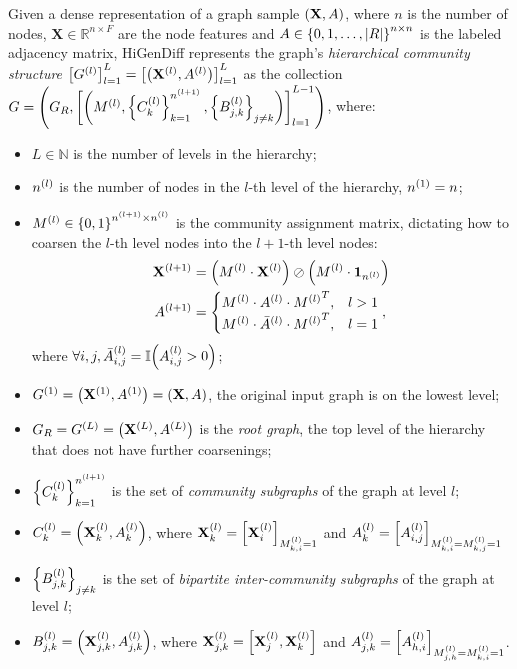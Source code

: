 Given a dense representation of a graph sample $\of{\mathbf{X},A}$, where $n$ is the number of nodes, $\mathbf{X} \in \mathbb{R}^{n \times F}$ are the node features and $A \in \offf{0,1,\dots,\abs{R}}^{n \times n}$ is the labeled adjacency matrix, HiGenDiff represents the graph's \emph{hierarchical community structure} $\off{G^{\of{l}}}_{l=1}^{L}=\off{\of{\mathbf{X}^{\of{l}},A^{\of{l}}}}_{l=1}^{L}$ as the collection $G=\of{G_R,\off{\of{M^{\of{l}}, \offf{C^{\of{l}}_{k}}_{k=1}^{n^{\of{l+1}}},\offf{B^{\of{l}}_{j,k}}_{j \neq k}}}_{l=1}^{L-1}}$, where:
\begin{itemize}
    \item $L \in \mathbb{N}$ is the number of levels in the hierarchy;
    \item $n^{\of{l}}$ is the number of nodes in the $l$-th level of the hierarchy, $n^{\of{1}}=n$;
    \item $M^{\of{l}} \in \offf{0,1}^{n^{\of{l+1}} \times n^{\of{l}}}$ is the community assignment matrix, dictating how to coarsen the $l$-th level nodes into the $l+1$-th level nodes:
    \begin{align}
        \begin{split}
            \mathbf{X}^{\of{l+1}}&=\of{M^{\of{l}} \cdot \mathbf{X}^{\of{l}}} \oslash \of{M^{\of{l}} \cdot \mathbf{1}_{n^{\of{l}}}} \\
            A^{\of{l+1}}&=\begin{cases}
                M^{\of{l}} \cdot A^{\of{l}} \cdot {M^{\of{l}}}^T, & l>1 \\
                M^{\of{l}} \cdot \bar{A}^{\of{l}} \cdot {M^{\of{l}}}^T, & l=1
            \end{cases},
        \end{split}
    \end{align}
    where $\forall i,j, \bar{A}^{\of{l}}_{i,j}=\mathbb{I}\of{A^{\of{l}}_{i,j}>0}$;
    \item $G^{\of{1}}=\of{\mathbf{X}^{\of{1}},A^{\of{1}}}=\of{\mathbf{X},A}$, the original input graph is on the lowest level;
    \item $G_R=G^{\of{L}}=\of{\mathbf{X}^{\of{L}}, A^{\of{L}}}$ is the \emph{root graph}, the top level of the hierarchy that does not have further coarsenings;
    \item $\offf{C^{\of{l}}_{k}}_{k=1}^{n^{\of{l+1}}}$ is the set of \emph{community subgraphs} of the graph at level $l$;
    \item $C^{\of{l}}_{k}=\of{\mathbf{X}_k^{\of{l}},A_k^{\of{l}}}$, where $\mathbf{X}_k^{\of{l}}=\off{\mathbf{X}_i^{\of{l}}}_{M^{\of{l}}_{k,i}=1}$ and $A_k^{\of{l}}=\off{A_{i,j}^{\of{l}}}_{M^{\of{l}}_{k,i}=M^{\of{l}}_{k,j}=1}$
    \item $\offf{B^{\of{l}}_{j,k}}_{j \neq k}$ is the set of \emph{bipartite inter-community subgraphs} of the graph at level $l$;
    \item $B^{\of{l}}_{j,k}=\of{\mathbf{X}_{j,k}^{\of{l}},A_{j,k}^{\of{l}}}$, where $\mathbf{X}_{j,k}^{\of{l}}=\off{\mathbf{X}_{j}^{\of{l}},\mathbf{X}_{k}^{\of{l}}}$ and $A_{j,k}^{\of{l}}=\off{A_{h,i}^{\of{l}}}_{M^{\of{l}}_{j,h}=M^{\of{l}}_{k,i}=1}$.
\end{itemize}


